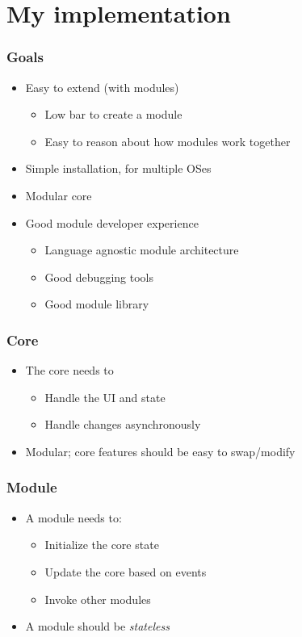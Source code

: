 \section{My implementation}
\SectionPage

\begin{frame}
  \frametitle{Goals}
  \begin{itemize}
    \item Easy to extend (with modules)
      \begin{itemize}
        \item Low bar to create a module
        \item Easy to reason about how modules work together
      \end{itemize}
    \item Simple installation, for multiple OSes
    \item Modular core
    \item Good module developer experience
      \begin{itemize}
        \item Language agnostic module architecture
        \item Good debugging tools
        \item Good module library
      \end{itemize}
  \end{itemize}
\end{frame}

\begin{frame}
  \frametitle{Core}
  \begin{itemize}
    \item The core needs to
      \begin{itemize}
        \item Handle the UI and state
        \item Handle changes asynchronously
      \end{itemize}
    \item Modular; core features should be easy to swap/modify
  \end{itemize}
\end{frame}

\begin{frame}
  \frametitle{Module}
  \begin{itemize}
    \item A module needs to:
      \begin{itemize}
        \item Initialize the core state
        \item Update the core based on events
        \item Invoke other modules
      \end{itemize}
    \item A module should be \textit{stateless}
  \end{itemize}
\end{frame}


